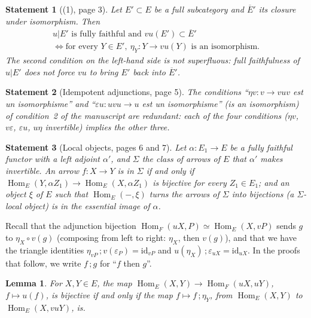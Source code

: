 \documentclass[11pt]{article}
\newcommand{\q}[1]{“#1”}
\theoremstyle{plain}
\newtheorem*{enonce}{Statement}
\newtheorem{lemme}{Lemma}[section]
\theoremstyle{definition}
\theoremstyle{remark}
\begin{document}
\begin{enonce}[(1), page 3]
Let $E' \subset E$ be a full subcategory and $\overline{E}'$ its closure under isomorphism. Then
\[
  \begin{gathered}
  u|E' \text{ is fully faithful and } vu(E') \subset \overline{E}' \\
  \iff \text{for every } Y \in E',\ \eta_Y : Y \to vu(Y) \text{ is an isomorphism.}
  \end{gathered}
\]
The second condition on the left-hand side is not superfluous: full faithfulness of $u|E'$ does not force $vu$ to bring $E'$ back into $\overline{E}'$.
\end{enonce}

\begin{enonce}[Idempotent adjunctions, page 5]
The conditions \q{$\eta v : v \to vuv$ est un isomorphisme} and \q{$\varepsilon u : uvu \to u$ est un isomorphisme} (is an isomorphism) of condition~2 of the manuscript are redundant: each of the four conditions ($\eta v$, $v\varepsilon$, $\varepsilon u$, $u\eta$ invertible) implies the other three.
\end{enonce}

\begin{enonce}[Local objects, pages 6 and 7]
Let $\alpha : E_1 \to E$ be a fully faithful functor with a left adjoint $\alpha'$, and $\Sigma$ the class of arrows of $E$ that $\alpha'$ makes invertible. An arrow $f : X \to Y$ is in $\Sigma$ if and only if $\operatorname{Hom}_E(Y, \alpha Z_1) \to \operatorname{Hom}_E(X, \alpha Z_1)$ is bijective for every $Z_1 \in E_1$; and an object $\xi$ of $E$ such that $\operatorname{Hom}_E(-, \xi)$ turns the arrows of $\Sigma$ into bijections (a $\Sigma$-local object) is in the essential image of $\alpha$.
\end{enonce}

Recall that the adjunction bijection $\operatorname{Hom}_F(uX, P) \simeq \operatorname{Hom}_E(X, vP)$ sends $g$ to $\eta_X \circ v(g)$ (composing from left to right: $\eta_X$, then $v(g)$), and that we have the triangle identities $\eta_{vP}\,;v(\varepsilon_P) = \mathrm{id}_{vP}$ and $u(\eta_X)\,;\varepsilon_{uX} = \mathrm{id}_{uX}$. In the proofs that follow, we write $f\,;g$ for \q{$f$ then $g$}.

\begin{lemme}\label{lem:161-1-hom}
For $X, Y \in E$, the map $\operatorname{Hom}_E(X, Y) \to \operatorname{Hom}_F(uX, uY)$, $f \mapsto u(f)$, is bijective if and only if the map $f \mapsto f\,;\eta_Y$, from $\operatorname{Hom}_E(X, Y)$ to $\operatorname{Hom}_E(X, vuY)$, is.
\end{lemme}
\end{document}
